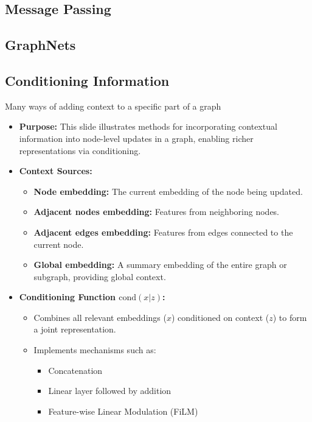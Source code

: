 \subsection{Message Passing}

\subsection{GraphNets}

\subsection{Conditioning Information}
\begin{notes}
    Many ways of adding context to a specific part of a graph \\
    \begin{itemize}
        \item \textbf{Purpose:} This slide illustrates methods for incorporating contextual information into node-level updates in a graph, enabling richer representations via conditioning.
    
        \item \textbf{Context Sources:}
        \begin{itemize}
            \item \textbf{Node embedding:} The current embedding of the node being updated.
            \item \textbf{Adjacent nodes embedding:} Features from neighboring nodes.
            \item \textbf{Adjacent edges embedding:} Features from edges connected to the current node.
            \item \textbf{Global embedding:} A summary embedding of the entire graph or subgraph, providing global context.
        \end{itemize}
    
        \item \textbf{Conditioning Function \(\text{cond}(x|z)\):}
        \begin{itemize}
            \item Combines all relevant embeddings (\(x\)) conditioned on context (\(z\)) to form a joint representation.
            \item Implements mechanisms such as:
            \begin{itemize}
                \item Concatenation
                \item Linear layer followed by addition
                \item Feature-wise Linear Modulation (FiLM)
            \end{itemize}
        \end{itemize}
    

\end{itemize}
\end{notes}
